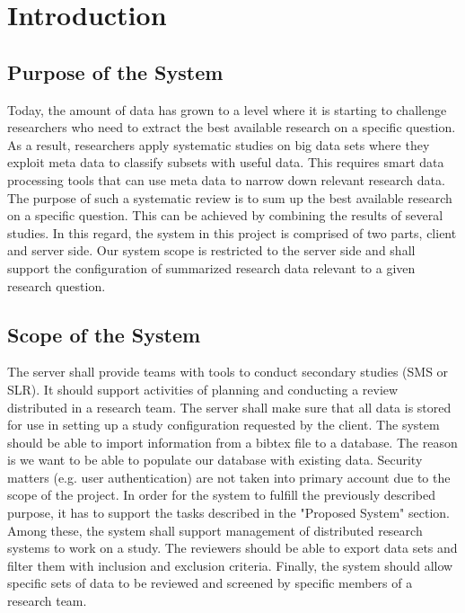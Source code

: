 
\section{Introduction}

\subsection{Purpose of the System}
Today, the amount of data has grown to a level where it is starting to challenge researchers who need to extract the best available research on a specific question. As a result, researchers apply systematic studies on big data sets where they exploit meta data to classify subsets with useful data. This requires smart data processing tools that can use meta data to narrow down relevant research data. The purpose of such a systematic review is to sum up the best available research on a specific question. This can be achieved by combining the results of several studies. In this regard, the system in this project is comprised of two parts, client and server side. Our system scope is restricted to the server side and shall support the configuration of summarized research data relevant to a given research question. 

\subsection{Scope of the System}
The server shall provide teams with tools to conduct secondary studies (SMS or SLR). It should support activities of planning and conducting a review distributed in a research team. The server shall make sure that all data is stored for use in setting up a study configuration requested by the client. The system should be able to import information from a bibtex file to a database. The reason is we want to be able to populate our database with existing data. Security matters (e.g. user authentication) are not taken into primary account due to the scope of the project. 
In order for the system to fulfill the previously described purpose, it has to support the tasks described in the "Proposed System" section. Among these, the system shall support management of distributed research systems to work on a study. The reviewers should be able to export data sets and filter them with inclusion and exclusion criteria. Finally, the system should allow specific sets of data to be reviewed and screened by specific members of a research team. 

